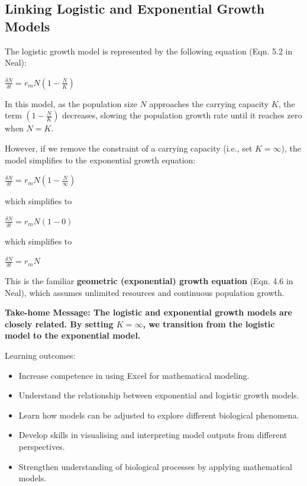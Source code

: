 \documentclass[
  a4paper]{book}
\providecommand{\tightlist}{%
  \setlength{\itemsep}{0pt}\setlength{\parskip}{0pt}}
\begin{document}
\subsection{Linking Logistic and Exponential Growth Models}\label{linking-logistic-and-exponential-growth-models}

The logistic growth model is represented by the following equation (Eqn. 5.2 in Neal):

\(\frac{\delta N}{\delta t}=r_m N\left(1-\frac{N}{K}\right)\)

In this model, as the population size \(N\) approaches the carrying capacity \(K\), the term \(\left(1 - \frac{N}{K}\right)\) decreases, slowing the population growth rate until it reaches zero when \(N = K\).

However, if we remove the constraint of a carrying capacity (i.e., set \(K = \infty\)), the model simplifies to the exponential growth equation:

\(\frac{\delta N}{\delta t}=r_m N\left(1-\frac{N}{\infty}\right)\)

which simplifies to

\(\frac{\delta N}{\delta t}=r_m N\left(1-0\right)\)

which simplifies to

\(\frac{\delta N}{\delta t}= r_m N\)

This is the familiar \textbf{geometric (exponential) growth equation} (Eqn. 4.6 in Neal), which assumes unlimited resources and continuous population growth.

\textbf{Take-home Message: The logistic and exponential growth models are closely related. By setting \(K = \infty\), we transition from the logistic model to the exponential model.}

\begin{do-something}
Learning outcomes:

\begin{itemize}
\tightlist
\item
  Increase competence in using Excel for mathematical modeling.
\item
  Understand the relationship between exponential and logistic growth
  models.
\item
  Learn how models can be adjusted to explore different biological
  phenomena.
\item
  Develop skills in visualising and interpreting model outputs from
  different perspectives.
\item
  Strengthen understanding of biological processes by applying
  mathematical models.
\end{itemize}
\end{do-something}
\end{document}
